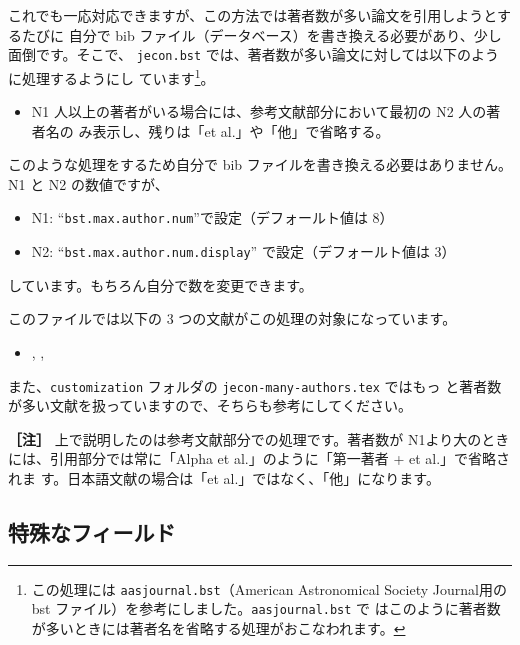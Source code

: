 \documentclass[article]{jlreq}
\newcommand{\midashii}[1]{\noindent \textbf{［#1］}}
\begin{document}
これでも一応対応できますが、この方法では著者数が多い論文を引用しようとするたびに
自分で bib ファイル（データベース）を書き換える必要があり、少し面倒です。そこで、
\texttt{jecon.bst} では、著者数が多い論文に対しては以下のように処理するようにし
ています\footnote{この処理には \texttt{aasjournal.bst}（American Astronomical
Society Journal用の bst ファイル）を参考にしました。\texttt{aasjournal.bst} で
はこのように著者数が多いときには著者名を省略する処理がおこなわれます。}。
\begin{screen}
\begin{itemize}
 \item N1 人以上の著者がいる場合には、参考文献部分において最初の N2 人の著者名の
       み表示し、残りは「et al.」や「他」で省略する。
\end{itemize}
\end{screen}
このような処理をするため自分で bib ファイルを書き換える必要はありません。N1 と
N2 の数値ですが、
\begin{itemize}
 \item N1: ``\texttt{bst.max.author.num}''で設定（デフォールト値は 8）
 \item N2: ``\texttt{bst.max.author.num.display}'' で設定（デフォールト値は 3）
\end{itemize}
しています。もちろん自分で数を変更できます。

このファイルでは以下の 3 つの文献がこの処理の対象になっています。
\begin{itemize}
 \item \citet{doi:10.1175/2009BAMS2778.1}, \citet{doi:10.1175/2009BAMS2778.1}, \citet{Li_2018}
\end{itemize}

また、\texttt{customization} フォルダの \texttt{jecon-many-authors.tex} ではもっ
と著者数が多い文献を扱っていますので、そちらも参考にしてください。

\vspace*{1em}

\midashii{注} 上で説明したのは参考文献部分での処理です。著者数が N1より大のとき
 には、引用部分では常に「Alpha et al.」のように「第一著者 + et al.」で省略されま
 す。日本語文献の場合は「et al.」ではなく、「他」になります。

\vspace*{1em}


\subsection{特殊なフィールド}
\end{document}
